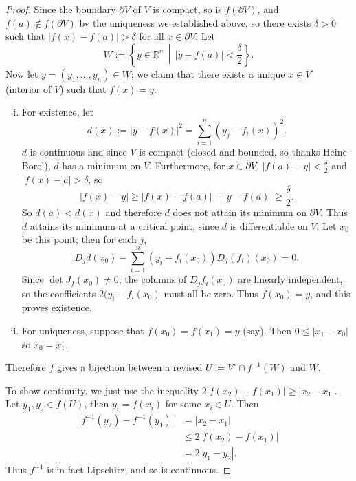 \documentclass[12pt]{article}
\newcommand{\real}{\mathbb{R}}
\newcommand\inv[1]{#1^{-1}}
\newcommand\setb[1]{\left \{ #1 \right \}}
\newcommand{\paren}[1]{\left( #1 \right)}
\theoremstyle{definition}
\theoremstyle{remark}
\begin{document}
\begin{proof}
    Since the boundary $\partial V$ of $V$ is compact, so is $f(\partial V)$, and $f(a) \notin f(\partial V)$ by the uniqueness we established above, so there exists $\delta > 0$ such that $|f(x) - f(a)| > \delta$ for all $x \in \partial V$. Let 
    \[
        W := \setb{ y \in \real^n \, \middle| \, |y - f(a)| < \frac{\delta}{2} }.
    \]
    Now let $y = (y_1 , \dotsc , y_n) \in W$; we claim that there exists a unique $x \in V^{\circ}$ (interior of $V$) such that $f(x) = y$.
    \begin{enumerate}[(i)]
        \item For existence, let 
        \[
            d(x) := |y - f(x)|^2 = \sum\limits_{i = 1}^n \paren{ y_j - f_i(x) }^2.
        \]
        $d$ is continuous and since $V$ is compact (closed and bounded, so thanks Heine-Borel), $d$ has a minimum on $V$. Furthermore, for $x \in \partial V$, $|f(a) - y| < \frac{\delta}{2}$ and $|f(x) - a| > \delta$, so 
        \[
            |f(x) - y| \geq |f(x) - f(a)| - |y - f(a)| \geq \frac{\delta}{2}.
        \]
        So $d(a) < d(x)$ and therefore $d$ does not attain its minimum on $\partial V$. Thus $d$ attains its minimum at a critical point, since $d$ is differentiable on $V$. Let $x_0$ be this point; then for each $j$,
        \[
            D_jd(x_0) - \sum\limits_{i = 1}^n \paren{ y_i - f_i(x_0) } D_j(f_i)(x_0) = 0.
        \]
        Since $\det J_f(x_0) \neq 0$, the columns of $D_jf_i(x_0)$ are linearly independent, so the coefficients $2(y_i - f_i(x_0)$ must all be zero. Thus $f(x_0) = y$, and this proves existence.
        \item For uniqueness, suppose that $f(x_0) = f(x_1) = y$ (say). Then $0 \leq |x_1 - x_0|$ so $x_0 = x_1$.
    \end{enumerate}
    Therefore $f$ gives a bijection between a revised $U := V^{\circ} \cap \inv{f}(W)$ and $W$.
    
    To show continuity, we just use the inequality $2|f(x_2) - f(x_1)| \geq |x_2 - x_1|$. Let $y_1 , y_2 \in f(U)$, then $y_i = f(x_i)$ for some $x_i \in U$. Then 
    \begin{align*}
        \left| \inv{f}(y_2) - \inv{f}(y_1) \right| & = |x_2 - x_1| \\
        & \leq 2 |f(x_2) - f(x_1)| \\
        & = 2 |y_1 - y_2|.
    \end{align*}
    Thus $\inv{f}$ is in fact Lipschitz, and so is continuous. 
    

\end{proof}
\end{document}
